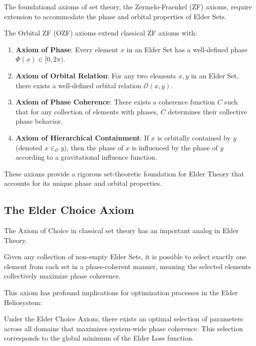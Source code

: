 \begin{theorem}
\begin{definition}
\begin{definition}
\begin{enumerate}
The foundational axioms of set theory, the Zermelo-Fraenkel (ZF) axioms, require extension to accommodate the phase and orbital properties of Elder Sets.

\begin{definition}
The Orbital ZF (OZF) axioms extend classical ZF axioms with:
\begin{enumerate}
    \item \textbf{Axiom of Phase}: Every element $x$ in an Elder Set has a well-defined phase $\Phi(x) \in [0, 2\pi)$.
    \item \textbf{Axiom of Orbital Relation}: For any two elements $x, y$ in an Elder Set, there exists a well-defined orbital relation $\mathcal{O}(x, y)$.
    \item \textbf{Axiom of Phase Coherence}: There exists a coherence function $C$ such that for any collection of elements with phases, $C$ determines their collective phase behavior.
    \item \textbf{Axiom of Hierarchical Containment}: If $x$ is orbitally contained by $y$ (denoted $x \in_{\mathcal{O}} y$), then the phase of $x$ is influenced by the phase of $y$ according to a gravitational influence function.
\end{enumerate}
\end{definition}

These axioms provide a rigorous set-theoretic foundation for Elder Theory that accounts for its unique phase and orbital properties.

\subsection{The Elder Choice Axiom}

The Axiom of Choice in classical set theory has an important analog in Elder Theory.

\begin{axiom}
Given any collection of non-empty Elder Sets, it is possible to select exactly one element from each set in a phase-coherent manner, meaning the selected elements collectively maximize phase coherence.
\end{axiom}

This axiom has profound implications for optimization processes in the Elder Heliosystem:

\begin{theorem}
Under the Elder Choice Axiom, there exists an optimal selection of parameters across all domains that maximizes system-wide phase coherence. This selection corresponds to the global minimum of the Elder Loss function.
\end{theorem}


\end{enumerate}
\end{definition}
\end{definition}
\end{theorem}
